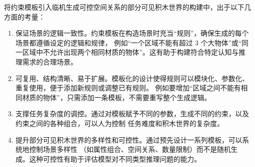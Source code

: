 将约束模板引入临机生成可控空间关系的部分可见积木世界的构建中，出于以下几方面的考量：
\begin{enumerate}[nosep]
\item 保证场景的逻辑一致性。约束模板在构造场景时充当“规则”，确保生成的每个场景都遵循设定的逻辑和规律，
例如“一个区域不能有超过 3 个大物体”或“同一区域中不允许出现两个相同材质的物体”。这有助于构建符合特定认知与推理需求的合理场景。
\item 可复用、结构清晰、易于扩展。模板化的设计使得规则可以模块化、参数化、重复使用，便于添加新规则或调整已有规则。
例如要增加“区域之间不能有相同材质的物体”，只需添加一条模板，不需要重写整个生成逻辑。
\item 支撑任务复杂度的调控。通过对模板赋予不同的参数，生成不同的约束，以及约束之间的各种组合，可以人为控制
任务难度和积木世界的复杂度。
\item 提升部分可见积木世界的多样性和可控性。通过预先设计一系列模板，可以系统地控制场景多样性
（如属性组合、空间关系、数量限制）而不是随机生成。这种可控性有助于评估模型对不同类型推理问题的能力。
\end{enumerate}

